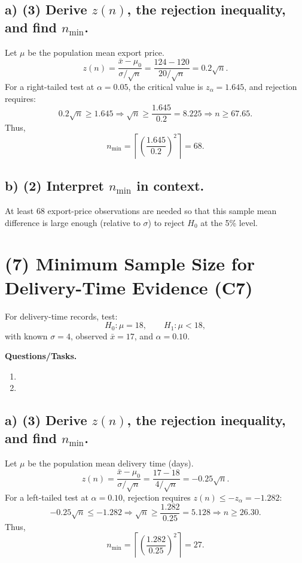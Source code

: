 \subsection*{a) \textbf{(3)} Derive \(z(n)\), the rejection inequality, and find \(n_{\min}\).}
\label{subsec:export-price-minimum-sample-size-c7-a}
Let \(\mu\) be the population mean export price.
\[
z(n)=\frac{\bar x-\mu_0}{\sigma/\sqrt n}=\frac{124-120}{20/\sqrt n}=0.2\sqrt n.
\]
For a right-tailed test at \(\alpha=0.05\), the critical value is \(z_\alpha=1.645\), and rejection requires:
\[
0.2\sqrt n\ge1.645
\Rightarrow
\sqrt n\ge\frac{1.645}{0.2}=8.225
\Rightarrow
n\ge67.65.
\]
Thus,
\[
n_{\min}=\left\lceil\left(\frac{1.645}{0.2}\right)^2\right\rceil=68.
\]


\subsection*{b) \textbf{(2)} Interpret \(n_{\min}\) in context.}
\label{subsec:export-price-minimum-sample-size-c7-b}
At least \(68\) export-price observations are needed so that this sample mean difference is large enough (relative to \(\sigma\)) to reject \(H_0\) at the 5\% level.


\section{(7) Minimum Sample Size for Delivery-Time Evidence (C7)}
\label{sec:delivery-time-minimum-sample-size-c7}
For delivery-time records, test:
\[
H_0:\mu=18,\qquad H_1:\mu<18,
\]
with known \(\sigma=4\), observed \(\bar x=17\), and \(\alpha=0.10\).

\textbf{Questions/Tasks.}
\begin{enumerate}[label=\textbf{\alph*)}]
    \item {}
    \item {}
\end{enumerate}

\subsection*{a) \textbf{(3)} Derive \(z(n)\), the rejection inequality, and find \(n_{\min}\).}
\label{subsec:delivery-time-minimum-sample-size-c7-a}
Let \(\mu\) be the population mean delivery time (days).
\[
z(n)=\frac{\bar x-\mu_0}{\sigma/\sqrt n}=\frac{17-18}{4/\sqrt n}=-0.25\sqrt n.
\]
For a left-tailed test at \(\alpha=0.10\), rejection requires \(z(n)\le -z_\alpha=-1.282\):
\[
-0.25\sqrt n\le-1.282
\Rightarrow
\sqrt n\ge\frac{1.282}{0.25}=5.128
\Rightarrow
n\ge26.30.
\]
Thus,
\[
n_{\min}=\left\lceil\left(\frac{1.282}{0.25}\right)^2\right\rceil=27.
\]

